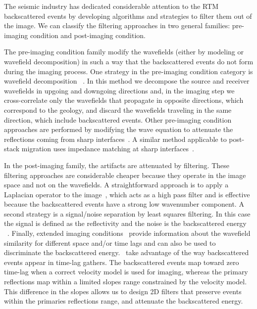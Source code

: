 The seismic industry has dedicated considerable attention to the RTM backscattered events by 
developing algorithms and strategies to filter them out of the image. We can classify the filtering
 approaches in two general families: pre-imaging condition and post-imaging condition. 


The pre-imaging condition family modify the wavefields (either by modeling or wavefield decomposition)
 in such a way that the backscattered events do not form during the imaging process.
One strategy in the pre-imaging condition category is wavefield decomposition
~\citep[]{liu:S29,fei:3130}. In this method we decompose the source and receiver wavefields in upgoing
and downgoing directions and, in the imaging step we cross-correlate only the wavefields that propagate
in opposite directions, which correspond to the geology, and discard the wavefields traveling in the same direction,
 which include backscattered events. Other pre-imaging 
condition approaches are performed by modifying  the wave equation to attenuate the reflections coming from 
sharp interfaces~\citep{fletcher:2049}. A similar method applicable to post-stack migration 
uses impedance matching at sharp interfaces~\citep{baysal:132}. 

In the post-imaging family, the artifacts are attenuated by filtering. These filtering approaches
 are considerable cheaper because they operate in the image space and not on the wavefields. A straightforward
 approach is to apply a Laplacian operator to the image~\citep{youn:246}, which
 acts as a high pass filter and is effective because the backscattered events have a strong low wavenumber
component. A second strategy is a signal/noise  separation by least squares filtering. In
 this case the signal is defined as the reflectivity and the noise is the backscattered energy
~\citep{guitton:S19}. Finally, extended imaging conditions~\citep{sava:S209} provide information
 about the wavefield similarity for different space and/or time lags and can also be used to discriminate
the backscattered energy.~\cite{kaelin:3125} take advantage of the way backscattered events appear in 
time-lag gathers. The backscattered events map toward zero time-lag when a correct velocity model is used for imaging,
 whereas the primary reflections map within a limited slopes range constrained by the velocity model. This difference in
 the slopes allows us to design 2D filters that preserve events within the primaries reflections range, and
attenuate the backscattered energy.

